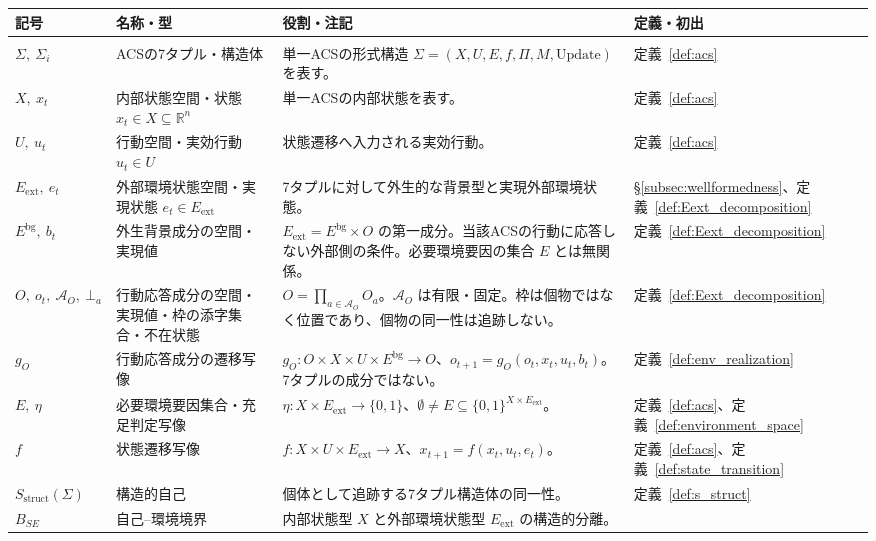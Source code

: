 \begingroup
\small
\setlength{\tabcolsep}{4pt}
\renewcommand{\arraystretch}{1.18}
\begin{longtable}{p{3.0cm} p{3.0cm} p{6.6cm} p{2.0cm}}
\hline
\textbf{記号} & \textbf{名称・型} & \textbf{役割・注記} & \textbf{定義・初出} \\
\hline
\endhead
\hline
\endfoot
\multicolumn{4}{l}{\textbf{基礎構造と自己--環境分離}} \\[2pt]
$\Sigma,\ \Sigma_i$ & ACSの7タプル・構造体 &
単一ACSの形式構造 $\Sigma=(X,U,E,f,\Pi,M,\mathrm{Update})$ を表す。 &
定義~\ref{def:acs} \\[3pt]
$X,\ x_t$ & 内部状態空間・状態 $x_t\in X\subseteq\mathbb R^n$ &
単一ACSの内部状態を表す。 &
定義~\ref{def:acs} \\[3pt]
$U,\ u_t$ & 行動空間・実効行動 $u_t\in U$ &
状態遷移へ入力される実効行動。 &
定義~\ref{def:acs} \\[3pt]
$E_{\mathrm{ext}},\ e_t$ & 外部環境状態空間・実現状態 $e_t\in E_{\mathrm{ext}}$ &
7タプルに対して外生的な背景型と実現外部環境状態。 &
\S\ref{subsec:wellformedness}、定義~\ref{def:Eext_decomposition} \\[3pt]
$E^{\mathrm{bg}},\ b_t$ & 外生背景成分の空間・実現値 &
$E_{\mathrm{ext}}=E^{\mathrm{bg}}\times O$ の第一成分。当該ACSの行動に応答しない外部側の条件。必要環境要因の集合 $E$ とは無関係。 &
定義~\ref{def:Eext_decomposition} \\[3pt]
$O,\ o_t,\ \mathcal A_O,\ \bot_a$ & 行動応答成分の空間・実現値・枠の添字集合・不在状態 &
$O=\prod_{a\in\mathcal A_O}O_a$。$\mathcal A_O$ は有限・固定。枠は個物ではなく位置であり、個物の同一性は追跡しない。 &
定義~\ref{def:Eext_decomposition} \\[3pt]
$g_O$ & 行動応答成分の遷移写像 &
$g_O:O\times X\times U\times E^{\mathrm{bg}}\to O$、$o_{t+1}=g_O(o_t,x_t,u_t,b_t)$。7タプルの成分ではない。 &
定義~\ref{def:env_realization} \\[3pt]
$E,\ \eta$ & 必要環境要因集合・充足判定写像 &
$\eta:X\times E_{\mathrm{ext}}\to\{0,1\}$、$\emptyset\neq E\subseteq\{0,1\}^{X\times E_{\mathrm{ext}}}$。 &
定義~\ref{def:acs}、定義~\ref{def:environment_space} \\[3pt]
$f$ & 状態遷移写像 &
$f:X\times U\times E_{\mathrm{ext}}\to X$、$x_{t+1}=f(x_t,u_t,e_t)$。 &
定義~\ref{def:acs}、定義~\ref{def:state_transition} \\[3pt]
$S_{\mathrm{struct}}(\Sigma)$ & 構造的自己 &
個体として追跡する7タプル構造体の同一性。 &
定義~\ref{def:s_struct} \\[3pt]
$B_{SE}$ & 自己--環境境界 &
内部状態型 $X$ と外部環境状態型 $E_{\mathrm{ext}}$ の構造的分離。 &

\end{longtable}
